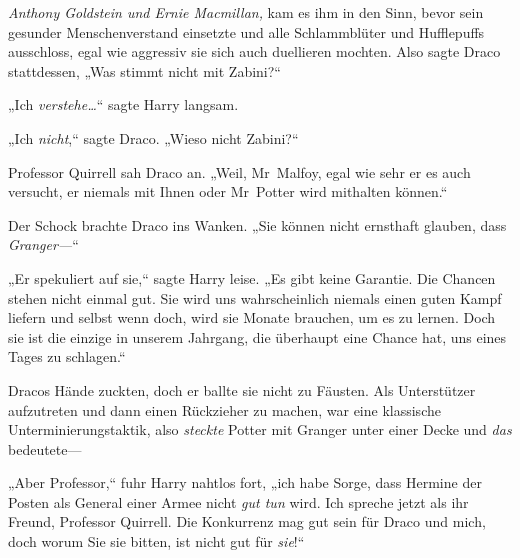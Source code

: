 \emph{Anthony Goldstein und Ernie Macmillan,} kam es ihm in den Sinn, bevor sein gesunder Menschenverstand einsetzte und alle Schlammblüter und Hufflepuffs ausschloss, egal wie aggressiv sie sich auch duellieren mochten. Also sagte Draco stattdessen, „Was stimmt nicht mit Zabini?“

„Ich \emph{verstehe…}“ sagte Harry langsam.

„Ich \emph{nicht},“ sagte Draco. „Wieso nicht Zabini?“

Professor Quirrell sah Draco an. „Weil, Mr~Malfoy, egal wie sehr er es auch versucht, er niemals mit Ihnen oder Mr~Potter wird mithalten können.“

Der Schock brachte Draco ins Wanken. „Sie können nicht ernsthaft glauben, dass \emph{Granger—}“

„Er spekuliert auf sie,“ sagte Harry leise. „Es gibt keine Garantie. Die Chancen stehen nicht einmal gut. Sie wird uns wahrscheinlich niemals einen guten Kampf liefern und selbst wenn doch, wird sie Monate brauchen, um es zu lernen. Doch sie ist die einzige in unserem Jahrgang, die überhaupt eine Chance hat, uns eines Tages zu schlagen.“

Dracos Hände zuckten, doch er ballte sie nicht zu Fäusten. Als Unterstützer aufzutreten und dann einen Rückzieher zu machen, war eine klassische Unterminierungstaktik, also \emph{steckte} Potter mit Granger unter einer Decke und \emph{das} bedeutete—

„Aber Professor,“ fuhr Harry nahtlos fort, „ich habe Sorge, dass Hermine der Posten als General einer Armee nicht \emph{gut tun} wird. Ich spreche jetzt als ihr Freund, Professor Quirrell. Die Konkurrenz mag gut sein für Draco und mich, doch worum Sie sie bitten, ist nicht gut für \emph{sie}!“

